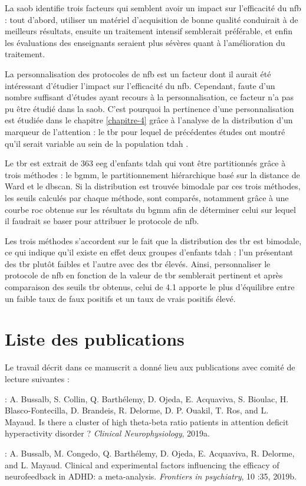 La \gls{saob} identifie trois facteurs qui semblent avoir un impact sur l'efficacité du \gls{nfb} : tout d'abord, utiliser un matériel d'acquisition de bonne 
qualité conduirait à de meilleurs résultats, ensuite un traitement intensif semblerait préférable, et enfin les évaluations des enseignants seraient plus
sévères quant à l'amélioration du traitement. 

La personnalisation des protocoles de \gls{nfb} est un facteur dont il aurait été intéressant d'étudier l'impact sur l'efficacité du \gls{nfb}.  
Cependant, faute d'un nombre suffisant d'études ayant recours à la personnalisation, ce facteur n'a pas pu être étudié dans la \gls{saob}. C'est pourquoi
la pertinence d'une personnalisation est étudiée dans le chapitre \ref{chapitre-4} grâce à l'analyse de la distribution d'un marqueur de l'attention : le \gls{tbr} pour
lequel de précédentes études ont montré qu'il serait variable au sein de la population \gls{tdah} \citep{Zhang2017, Arns2013, Clarke2001}.

Le \gls{tbr} est extrait de 363 \gls{eeg} d'enfants \gls{tdah} qui vont être partitionnés grâce à trois méthodes : le \gls{bgmm}, le partitionnement
hiérarchique basé sur la distance de Ward et le \gls{dbscan}. Si la distribution est trouvée bimodale par ces trois méthodes, les seuils calculés par chaque méthode,
sont comparés, notamment grâce à une courbe \gls{roc} obtenue sur
les résultats du \gls{bgmm} afin de déterminer celui sur lequel il faudrait se baser pour attribuer le protocole de \gls{nfb}.

Les trois méthodes s'accordent sur le fait que la distribution des \gls{tbr} est bimodale, ce qui indique qu'il existe en effet deux groupes d'enfants
\gls{tdah} : l'un présentant des \gls{tbr} plutôt faibles et l'autre avec des \gls{tbr} élevés. Ainsi, personnaliser le protocole de \gls{nfb} en 
fonction de la valeur de \gls{tbr} semblerait pertinent et après comparaison des seuils \gls{tbr} obtenus, celui de 4.1 apporte le plus d'équilibre entre 
un faible taux de faux positifs et un taux de vrais positifs élevé.  

\section{Liste des publications}

Le travail décrit dans ce manuscrit a donné lieu aux publications avec comité de lecture suivantes :

\begin{description}
\item \citet{Bussalb2019tbr} : A. Bussalb, S. Collin, Q. Barthélemy, D. Ojeda, E. Acquaviva, S. Bioulac, H. Blasco-Fontecilla,
D. Brandeis, R. Delorme, D. P. Ouakil, T. Ros, and L. Mayaud. Is there a cluster of high
theta-beta ratio patients in attention deficit hyperactivity disorder ? \textit{Clinical Neurophysiology}, 2019a.
\item \citet{Bussalb2019clinical} : A. Bussalb, M. Congedo, Q. Barthélemy, D. Ojeda, E. Acquaviva, R. Delorme,
and L. Mayaud. Clinical and experimental factors influencing the efficacy of
neurofeedback in ADHD: a meta-analysis. \textit{Frontiers in psychiatry}, 10 :35, 2019b.
\end{description}

